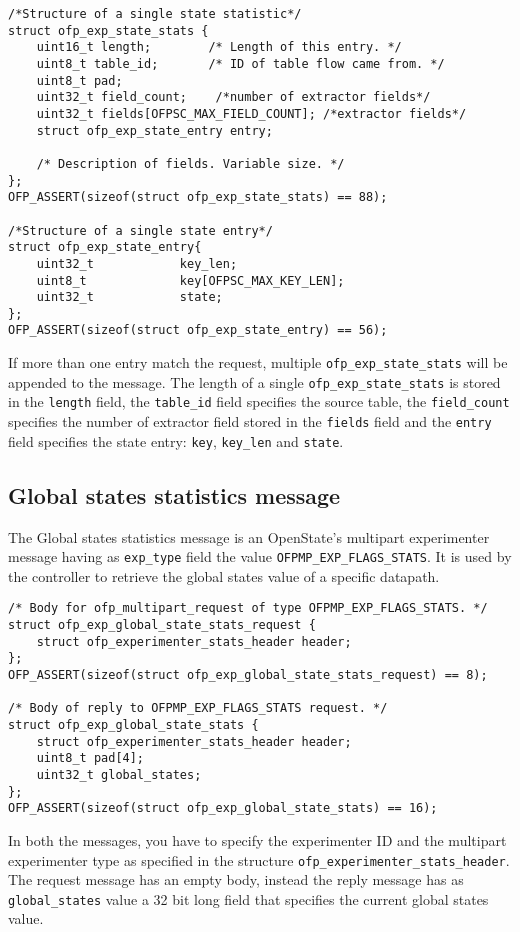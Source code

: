 \scriptsize\begin{verbatim}
/*Structure of a single state statistic*/
struct ofp_exp_state_stats {
    uint16_t length;        /* Length of this entry. */
    uint8_t table_id;       /* ID of table flow came from. */
    uint8_t pad;
    uint32_t field_count;    /*number of extractor fields*/
    uint32_t fields[OFPSC_MAX_FIELD_COUNT]; /*extractor fields*/    
    struct ofp_exp_state_entry entry;
    
    /* Description of fields. Variable size. */
};
OFP_ASSERT(sizeof(struct ofp_exp_state_stats) == 88);

/*Structure of a single state entry*/
struct ofp_exp_state_entry{
    uint32_t            key_len;
    uint8_t             key[OFPSC_MAX_KEY_LEN];
    uint32_t            state;
};
OFP_ASSERT(sizeof(struct ofp_exp_state_entry) == 56);
\end{verbatim}\normalsize
If more than one entry match the request, multiple \texttt{ofp\_exp\_state\_stats} will be appended to the message.
The length of a single \texttt{ofp\_exp\_state\_stats} is stored in the \texttt{length} field, the \texttt{table\_id} field specifies the source table, the \texttt{field\_count} specifies the number of extractor field stored in the \texttt{fields} field and the \texttt{entry} field specifies the state entry: \texttt{key}, \texttt{key\_len} and \texttt{state}.

\subsection{Global states statistics message}

\label{sec:msg_global_stats_proto}

The Global states statistics message is an OpenState's multipart experimenter message having as \texttt{exp\_type} field the value \texttt{OFPMP\_EXP\_FLAGS\_STATS}.
It is used by the controller to retrieve the global states value of a specific datapath.

\scriptsize\begin{verbatim}
/* Body for ofp_multipart_request of type OFPMP_EXP_FLAGS_STATS. */
struct ofp_exp_global_state_stats_request {
    struct ofp_experimenter_stats_header header;
};
OFP_ASSERT(sizeof(struct ofp_exp_global_state_stats_request) == 8);

/* Body of reply to OFPMP_EXP_FLAGS_STATS request. */
struct ofp_exp_global_state_stats {
    struct ofp_experimenter_stats_header header;
    uint8_t pad[4];
    uint32_t global_states;
};
OFP_ASSERT(sizeof(struct ofp_exp_global_state_stats) == 16);
\end{verbatim}\normalsize
In both the messages, you have to specify the experimenter ID and the multipart experimenter type as specified in the structure \texttt{ofp\_experimenter\_stats\_header}.
The request message has an empty body, instead the reply message has as \texttt{global\_states} value a 32 bit long field that specifies the current global states value.
